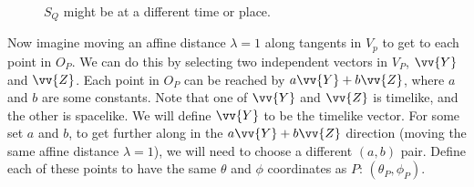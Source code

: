 \documentclass[11pt,table]{article}
\begin{document}
\begin{figure}[!h]
\caption{$S_Q$ might be at a different time or place.}
\label{fig:q}
\end{figure}

Now imagine moving an affine distance $\lambda = 1$ along tangents in $V_p$ to get to each point in $O_P$. We can do this by selecting two independent vectors in $V_P$, $\vv{Y}$ and $\vv{Z}$. Each point in $O_P$ can be reached by $a\vv{Y} + b\vv{Z}$, where $a$ and $b$ are some constants. Note that one of $\vv{Y}$ and $\vv{Z}$ is timelike, and the other is spacelike. We will define $\vv{Y}$ to be the timelike vector.
For some set $a$ and $b$, to get further along in the $a\vv{Y} + b\vv{Z}$ direction (moving the same affine distance $\lambda = 1$), we will need to choose a different $(a,b)$ pair. Define each of these points to have the same $\theta$ and $\phi$ coordinates as $P$: $(\theta_P, \phi_P)$.
\end{document}
